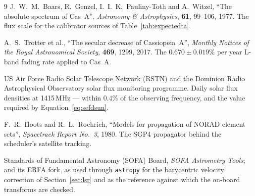 \documentclass[11pt,a4paper]{article}
\begin{document}
\begin{thebibliography}{9}
J.~W.~M.~Baars, R.~Genzel, I.~I.~K.~Pauliny-Toth and A.~Witzel,
``The absolute spectrum of Cas~A'',
\emph{Astronomy \& Astrophysics}, \textbf{61}, 99--106, 1977.
The flux scale for the calibrator sources of Table~\ref{tab:expectedta}.

A.~S.~Trotter et al., ``The secular decrease of Cassiopeia~A'',
\emph{Monthly Notices of the Royal Astronomical Society}, \textbf{469}, 1299, 2017.
The $0.670 \pm 0.019\%$ per year L-band fading rate applied to Cas~A.

US Air Force Radio Solar Telescope Network (RSTN) and the Dominion Radio Astrophysical Observatory
solar flux monitoring programme. Daily solar flux densities at 1415\,MHz --- within $0.4\%$ of the
observing frequency, and the value required by Equation~\eqref{eq:sefdsun}.

F.~R.~Hoots and R.~L.~Roehrich, ``Models for propagation of NORAD element sets'',
\emph{Spacetrack Report No.~3}, 1980.
The SGP4 propagator behind the scheduler's satellite tracking.

Standards of Fundamental Astronomy (SOFA) Board, \emph{SOFA Astrometry Tools};
and its ERFA fork, as used through \texttt{astropy} for the barycentric velocity correction of Section~\ref{sec:lsr} and as the reference against which the on-board transforms are checked.

\end{thebibliography}


\clearpage
{}
\printindex
\end{document}
